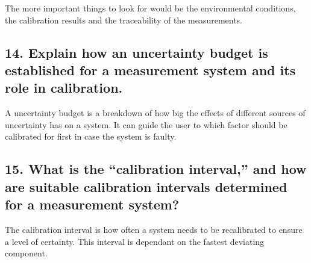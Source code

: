The more important things to look for would be the environmental conditions, the calibration results and the traceability of the measurements.


\subsection{\textbf{14. Explain how an uncertainty budget is established for a measurement system and its role in calibration.}}
A uncertainty budget is a breakdown of how big the effects of different sources of uncertainty has on a system. It can guide the user to which factor should be calibrated for first in case the system is faulty.


\subsection{\textbf{15. What is the “calibration interval,” and how are suitable calibration intervals determined for a measurement system?}}
The calibration interval is how often a system needs to be recalibrated to ensure a level of certainty. This interval is dependant on the fastest deviating component. 
